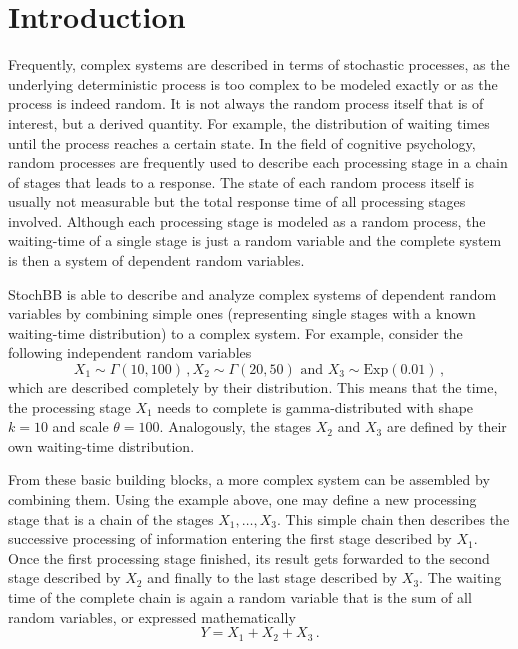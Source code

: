  \section{Introduction} \label{sec:intro}
Frequently, complex systems are described in terms of stochastic processes, as the
underlying deterministic process is too complex to be modeled exactly or as the
process is indeed random. It is not always the random process itself that is of 
interest, but a derived quantity. For example, the distribution of waiting times until the
process reaches a certain state. In the field of cognitive psychology, random processes are frequently used to
describe each processing stage in a chain of stages that leads to a response. The state of
each random process itself is usually not measurable but the total response time of all processing 
stages involved. Although each processing stage is modeled as a random process, the waiting-time
of a single stage is just a random variable and the complete system is then a system of dependent random 
variables.

StochBB is able to describe and analyze complex systems of dependent random variables
by combining simple ones (representing single stages with a known waiting-time distribution) to
a complex system. For example, consider the following independent random variables
\begin{equation}
  X_1 \sim \Gamma(10, 100)\,, X_2 \sim \Gamma(20, 50)\text{ and } X_3 \sim \text{Exp}(0.01)\,,\nonumber
\end{equation}
which are described completely by their distribution. This means that the time, the
processing stage $X_1$ needs to complete is gamma-distributed with shape $k=10$ and scale
$\theta=100$. Analogously, the stages $X_2$ and $X_3$ are defined by their own waiting-time 
distribution.

From these basic building blocks, a more complex system can be assembled by
combining them. Using the example above, one may define a new processing stage that is a chain of
the stages $X_1,\dots,X_3$. This simple chain then describes the successive
processing of information entering the first stage described by $X_1$.
Once the first processing stage finished, its result gets forwarded to the second stage described
by $X_2$ and finally to the last stage described by $X_3$. The waiting time of the
complete chain is again a random variable that is the sum of all random variables,
or expressed mathematically
\begin{equation}
 Y = X_1 + X_2 + X_3\,. \nonumber
\end{equation}

